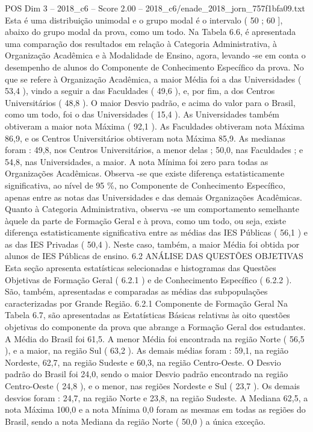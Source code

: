 \begin{textsample}{POS Dim 3 – 2018\_c6 – Score 2.00 – 2018\_c6/enade\_2018\_jorn\_757f1bfa09.txt}
Esta é uma distribuição unimodal e o grupo modal é o intervalo ( 50 ; 60 ], abaixo do grupo modal da prova, como um todo.
Na Tabela 6.6, é apresentada uma comparação dos resultados em relação à Categoria Administrativa, à Organização Acadêmica e à Modalidade de Ensino, agora, levando -se em conta o desempenho de alunos do Componente de Conhecimento Específico da prova.
No que se refere à Organização Acadêmica, a maior Média foi a das Universidades ( 53,4 ), vindo a seguir a das Faculdades ( 49,6 ), e, por fim, a dos Centros Universitários ( 48,8 ).
O maior Desvio padrão, e acima do valor para o Brasil, como um todo, foi o das Universidades ( 15,4 ).
As Universidades também obtiveram a maior nota Máxima ( 92,1 ).
As Faculdades obtiveram nota Máxima 86,9, e os Centros Universitários obtiveram nota Máxima 85,9.
As medianas foram : 49,8, nos Centros Universitários, a menor delas ; 50,0, nas Faculdades ; e 54,8, nas Universidades, a maior.
A nota Mínima foi zero para todas as Organizações Acadêmicas.
Observa -se que existe diferença estatisticamente significativa, ao nível de 95 \%, no Componente de Conhecimento Específico, apenas entre as notas das Universidades e das demais Organizações Acadêmicas.
Quanto à Categoria Administrativa, observa -se um comportamento semelhante àquele da parte de Formação Geral e à prova, como um todo, ou seja, existe diferença estatisticamente significativa entre as médias das IES Públicas ( 56,1 ) e as das IES Privadas ( 50,4 ).
Neste caso, também, a maior Média foi obtida por alunos de IES Públicas de ensino. 6.2 ANÁLISE DAS QUESTÕES OBJETIVAS Esta seção apresenta estatísticas selecionadas e histogramas das Questões Objetivas de Formação Geral ( 6.2.1 ) e de Conhecimento Específico ( 6.2.2 ).
São, também, apresentadas e comparadas as médias das subpopulações caracterizadas por Grande Região. 6.2.1 Componente de Formação Geral Na Tabela 6.7, são apresentadas as Estatísticas Básicas relativas às oito questões objetivas do componente da prova que abrange a Formação Geral dos estudantes.
A Média do Brasil foi 61,5.
A menor Média foi encontrada na região Norte ( 56,5 ), e a maior, na região Sul ( 63,2 ).
As demais médias foram : 59,1, na região Nordeste, 62,7, na região Sudeste e 60,3, na região Centro-Oeste.
O Desvio padrão do Brasil foi 24,0, sendo o maior Desvio padrão encontrado na região Centro-Oeste ( 24,8 ), e o menor, nas regiões Nordeste e Sul ( 23,7 ).
Os demais desvios foram : 24,7, na região Norte e 23,8, na região Sudeste.
A Mediana 62,5, a nota Máxima 100,0 e a nota Mínima 0,0 foram as mesmas em todas as regiões do Brasil, sendo a nota Mediana da região Norte ( 50,0 ) a única exceção.

\end{textsample}
